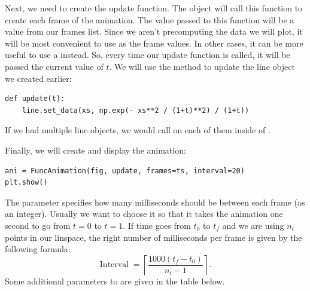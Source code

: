 Next, we need to create the update function.
The  object will call this function to create each frame of the animation.
The value passed to this function will be a value from our frames list.
Since we aren't precomputing the data we will plot, it will be most convenient to use  as the frame values.
In other cases, it can be more useful to use a  instead.
So, every time our update function is called, it will be passed the current value of $t$.
We will use the  method to update the line object we created earlier:
\begin{lstlisting}
def update(t):
    line.set_data(xs, np.exp(- xs**2 / (1+t)**2) / (1+t))
\end{lstlisting}
If we had multiple line objects, we would call  on each of them inside of .

Finally, we will create and display the animation:
\begin{lstlisting}
ani = FuncAnimation(fig, update, frames=ts, interval=20)
plt.show()
\end{lstlisting}
The  parameter specifies how many milliseconds should be between each frame (as an integer).
Usually we want to choose it so that it takes the animation one second to go from $t=0$ to $t=1$.
If time goes from $t_0$ to $t_f$ and we are using $n_t$ points in our linspace, the right number of milliseconds per frame is given by the following formula:
\begin{equation*}
\text{Interval} \;=
\left\lceil
\frac{1000(t_f-t_0)}{n_t-1}
\right\rceil.
\end{equation*}
Some additional parameters to  are given in the table below.

